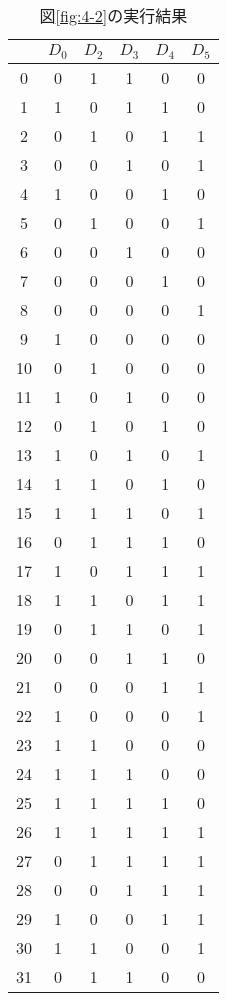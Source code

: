 \documentclass[dvipdfmx]{jsarticle}
\begin{document}
\begin{table}[H]
  \centering
  \caption{図\ref*{fig:4-2}の実行結果}
  \begin{tabular}{|c|ccccc|}\hline
    & $D_0$ & $D_2$ & $D_3$ & $D_4$ & $D_5$ \\ \hline
    0 & 0 & 1 & 1 & 0 & 0 \\ \hline
    1 & 1 & 0 & 1 & 1 & 0 \\ \hline
    2 & 0 & 1 & 0 & 1 & 1 \\ \hline
    3 & 0 & 0 & 1 & 0 & 1 \\ \hline
    4 & 1 & 0 & 0 & 1 & 0 \\ \hline
    5 & 0 & 1 & 0 & 0 & 1 \\ \hline
    6 & 0 & 0 & 1 & 0 & 0 \\ \hline
    7 & 0 & 0 & 0 & 1 & 0 \\ \hline
    8 & 0 & 0 & 0 & 0 & 1 \\ \hline
    9 & 1 & 0 & 0 & 0 & 0 \\ \hline
    10 & 0 & 1 & 0 & 0 & 0 \\ \hline
    11 & 1 & 0 & 1 & 0 & 0 \\ \hline
    12 & 0 & 1 & 0 & 1 & 0 \\ \hline
    13 & 1 & 0 & 1 & 0 & 1 \\ \hline
    14 & 1 & 1 & 0 & 1 & 0 \\ \hline
    15 & 1 & 1 & 1 & 0 & 1 \\ \hline
    16 & 0 & 1 & 1 & 1 & 0 \\ \hline
    17 & 1 & 0 & 1 & 1 & 1 \\ \hline
    18 & 1 & 1 & 0 & 1 & 1 \\ \hline
    19 & 0 & 1 & 1 & 0 & 1 \\ \hline
    20 & 0 & 0 & 1 & 1 & 0 \\ \hline
    21 & 0 & 0 & 0 & 1 & 1 \\ \hline
    22 & 1 & 0 & 0 & 0 & 1 \\ \hline
    23 & 1 & 1 & 0 & 0 & 0 \\ \hline
    24 & 1 & 1 & 1 & 0 & 0 \\ \hline
    25 & 1 & 1 & 1 & 1 & 0 \\ \hline
    26 & 1 & 1 & 1 & 1 & 1 \\ \hline
    27 & 0 & 1 & 1 & 1 & 1 \\ \hline
    28 & 0 & 0 & 1 & 1 & 1 \\ \hline
    29 & 1 & 0 & 0 & 1 & 1 \\ \hline
    30 & 1 & 1 & 0 & 0 & 1 \\ \hline
    31 & 0 & 1 & 1 & 0 & 0 \\ \hline
  \end{tabular}
  \label{tb:4-2}
\end{table}
\end{document}

